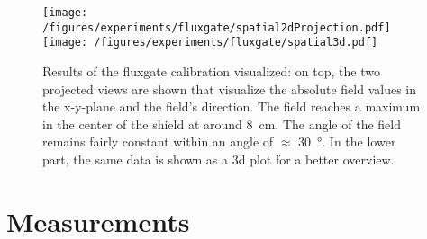         \begin{figure}
            \label{fig:results:fluxgate:plotSpatial3d}
            \centering
            \texttt{[image: /figures/experiments/fluxgate/spatial2dProjection.pdf]}
            \texttt{[image: /figures/experiments/fluxgate/spatial3d.pdf]}
            \caption{Results of the fluxgate calibration visualized: on top, the two projected views are shown that visualize the absolute field values in the x-y-plane and the field's direction. The field reaches a maximum in the center of the shield at around \SI{8}{\centi\meter}. The angle of the field remains fairly constant within an angle of $\approx$ \SI{30}{\degree}. In the lower part, the same data is shown as a 3d plot for a better overview.}
        \end{figure}
\section{Measurements}
